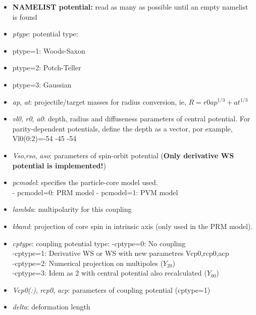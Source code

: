 \documentclass[preprint,12pt]{elsarticle}
\begin{document}
\begin{itemize}
                   
\item \textbf{NAMELIST potential:} read as many as possible until an empty namelist is found
\bi
\item {\it ptype}: potential type: 
\bi
\item         ptype=1: Woods-Saxon 
\item        ptype=2: Potch-Teller 
\item        ptype=3: Gaussian 
\ei
\item {\it ap}, {\it at}: projectile/target masses for radius conversion, ie, $R=r0{ap^{1/3}+at^{1/3}}$ 
\item  {\it vl0}, {\it r0}, {\it a0}: depth, radius and diffuseness parameters of central potential. For parity-dependent potentials, define the depth as a vector, por example, Vl0(0:2)=-54 -45 -54     
\item {\it Vso},{\it rso}, {\it aso}: parameters of spin-orbit potential
             ({\bf Only derivative WS potential is implemented!})
\item {\it pcmodel}: specifies the particle-core model used. \\
          - pcmodel=0: PRM model
          - pcmodel=1: PVM model

\item {\it lambda}: multipolarity for this coupling

\item {\it kband}: projection of core spin in intrinsic axis (only used in the PRM model). 
 
\item {\it cptype}: coupling potential type:
             -cptype=0: No coupling \\
	     -cptype=1: Derivative WS or WS with new parametres Vcp0,rcp0,acp\\
             -cptype=2: Numerical projection on multipoles ($Y_{20}$) \\
             -cptype=3: Idem as 2 with central potential also recalculated ($Y_{00}$) 
\item {\it Vcp0(:)}, {\it rcp0}, {\it acp}: parameters of coupling potential (cptype=1)
\item {\it delta}: deformation length
\ei




\end{itemize}
\end{document}

